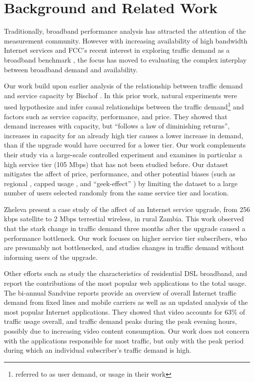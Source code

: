 \section{Background and Related Work}\label{sec:related}

Traditionally, broadband performance analysis has attracted the attention of 
the measurement community. However with increasing availability of high 
bandwidth Internet services and FCC's recent interest in exploring traffic 
demand as a broadband benchmark \cite{fcc2015progress-report}, the focus has 
moved to evaluating the complex interplay between broadband demand and 
availability.

Our work build upon earlier analysis of the relationship between traffic demand 
and service capacity by Bischof \ea \cite{dasu-imc2014}. In this prior work, 
natural experiments were used hypothesize and infer causal relationships between 
the traffic demand\footnote{referred to as user demand, or usage in their work} 
and factors such as service capacity, performance, and price. They showed 
that demand increases with capacity, but ``follows a law of diminishing  
returns'', \ie increases in capacity for an already high tier causes a lower 
increase in demand, than if the upgrade would have occurred for a lower tier. 
Our work complements their study via a large-scale controlled experiment and 
examines in particular a high service tier (105 Mbps) that has not been studied 
before. Our dataset mitigates the affect of price, performance, and other 
potential biases (such as regional \cite{dasu-weather, dasu-region}, capped 
usage \cite{usage-caps}, and ``geek-effect'' \cite{dasu-imc2014}) by limiting 
the dataset to a large number of users selected randomly from the same service 
tier and location.

Zheleva \ea present a case study of the affect of an Internet service 
upgrade, from 256 kbps satellite to 2 Mbps terrestial wireless, in rural Zambia. 
This work observed that the stark change in traffic demand three months after 
the upgrade caused a performance bottleneck. Our work focuses on higher 
service tier subscribers, who are presumably not bottlenecked, and studies 
changes in traffic demand without informing users of the upgrade.

Other efforts such as \cite{imc102-maier} study the characteristics of 
residential DSL broadband, and report the contributions of the most popular 
web applications to the total usage.
The bi-annual Sandvine reports \cite{sandvine2014report1h, 
sandvine2014report2h} provide an overview of overall Internet traffic 
demand from fixed lines and mobile carriers as well as an updated analysis of 
the most popular Internet applications. They showed that video accounts for 63\%
of traffic usage overall, and traffic demand peaks during the peak evening 
hours, possibly due to increasing video content consumption. Our work does not 
concern with the applications responsible for most traffic, but only with the 
peak period during which an individual subscriber's traffic demand is high.


